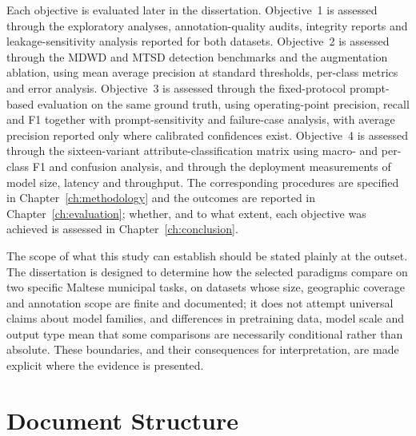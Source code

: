 Each objective is evaluated later in the dissertation. Objective~1 is assessed through the exploratory analyses, annotation-quality audits, integrity reports and leakage-sensitivity analysis reported for both datasets. Objective~2 is assessed through the MDWD and MTSD detection benchmarks and the augmentation ablation, using mean average precision at standard thresholds, per-class metrics and error analysis. Objective~3 is assessed through the fixed-protocol prompt-based evaluation on the same ground truth, using operating-point precision, recall and F1 together with prompt-sensitivity and failure-case analysis, with average precision reported only where calibrated confidences exist. Objective~4 is assessed through the sixteen-variant attribute-classification matrix using macro- and per-class F1 and confusion analysis, and through the deployment measurements of model size, latency and throughput. The corresponding procedures are specified in Chapter~\ref{ch:methodology} and the outcomes are reported in Chapter~\ref{ch:evaluation}; whether, and to what extent, each objective was achieved is assessed in Chapter~\ref{ch:conclusion}.

The scope of what this study can establish should be stated plainly at the outset. The dissertation is designed to determine how the selected paradigms compare on two specific Maltese municipal tasks, on datasets whose size, geographic coverage and annotation scope are finite and documented; it does not attempt universal claims about model families, and differences in pretraining data, model scale and output type mean that some comparisons are necessarily conditional rather than absolute. These boundaries, and their consequences for interpretation, are made explicit where the evidence is presented.

\section{Document Structure}
\label{sec:document-structure}

